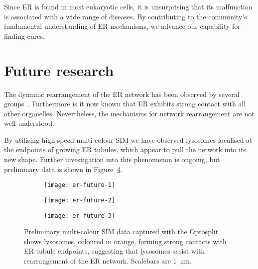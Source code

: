 Since ER is found in most eukaryotic cells, it is unsurprising that its malfunction is associated with a wide range of diseases. 
By contributing to the community's fundamental understanding of ER mechanisms, we advance our capability for finding cures. 

\section{Future research} \label{sec:ERfuture}
The dynamic rearrangement of the ER network has been observed by several groups~\cite{nixon2016increased, pendin2011balancing, yamanaka2018er}. 
Furthermore is it now known that ER exhibits strong contact with all other organelles. 
Nevertheless, the mechanisms for network rearrangement are not well understood. 

By utilising high-speed multi-colour SIM we have observed lysosomes localised at the endpoints of growing ER tubules, which appear to pull the network into its new shape. 
Further investigation into this phenomenon is ongoing, but preliminary data is shown in Figure~\ref{fig:er-future}. 

\begin{figure}[htbp!]
	\centering
		\begin{subfigure}[b]{0.325\textwidth}
		\texttt{[image: er-future-1]}
		\caption{} \label{fig:er-future-1}
	\end{subfigure}	
	\hfill
	\begin{subfigure}[b]{0.325\textwidth}
		\texttt{[image: er-future-2]}
		\caption{} \label{fig:er-future-2}
	\end{subfigure}
	\hfill
	\begin{subfigure}[b]{0.325\textwidth}
		\texttt{[image: er-future-3]}
		\caption{} \label{fig:er-future-3}
	\end{subfigure}
	\caption[ER: Lysosomes form strong contacts with ER tubule endpoints to rearrange the network]{Preliminary multi-colour SIM data captured with the Optosplit shows lysosomes, coloured in orange, forming strong contacts with ER tubule endpoints, suggesting that lysosomes assist with rearrangement of the ER network. Scalebars are \SI{1}{\micro\metre}.}
	\label{fig:er-future}
\end{figure}

